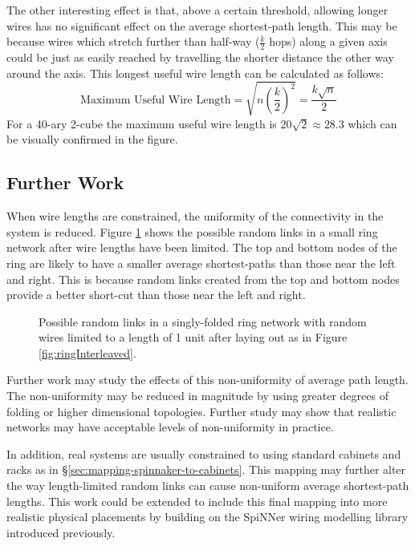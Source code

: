 			The other interesting effect is that, above a certain threshold, allowing
			longer wires has no significant effect on the average shortest-path
			length. This may be because wires which stretch further than half-way
			($\frac{k}{2}$ hops) along a given axis could be just as easily reached by
			travelling the shorter distance the other way around the axis. This
			longest useful wire length can be calculated as follows:
			\[
				\textrm{Maximum Useful Wire Length}
					= \sqrt{n \left({\frac{k}{2}}\right)^2}
					= \frac{k\sqrt{n}}{2}
			\]
			For a 40-ary 2-cube the maximum useful wire length is $20\sqrt{2} \approx
			28.3$ which can be visually confirmed in the figure.
		
		\subsection{Further Work}
			
			
			When wire lengths are constrained, the uniformity of the connectivity in
			the system is reduced. Figure \ref{fig:ringNetworkLimitedWires} shows the
			possible random links in a small ring network after wire lengths have been
			limited. The top and bottom nodes of the ring are likely to have a smaller
			average shortest-paths than those near the left and right. This is because
			random links created from the top and bottom nodes provide a better
			short-cut than those near the left and right.
			
			\begin{figure}
				\center
				
				\caption[Possible random links in a singly-folded ring network with
				short wires.]{Possible random links in a singly-folded ring network with
				random wires limited to a length of 1 unit after laying out as in Figure
				\ref{fig:ringInterleaved}.}
				\label{fig:ringNetworkLimitedWires}
			\end{figure}
			
			Further work may study the effects of this non-uniformity of average path
			length. The non-uniformity may be reduced in magnitude by using greater
			degrees of folding or higher dimensional topologies. Further study may
			show that realistic networks may have acceptable levels of non-uniformity
			in practice.
			
			In addition, real systems are usually constrained to using standard
			cabinets and racks as in \S\ref{sec:mapping-spinnaker-to-cabinets}. This
			mapping may further alter the way length-limited random links can cause
			non-uniform average shortest-path lengths. This work could be extended to
			include this final mapping into more realistic physical placements by
			building on the SpiNNer wiring modelling library introduced previously.
	
